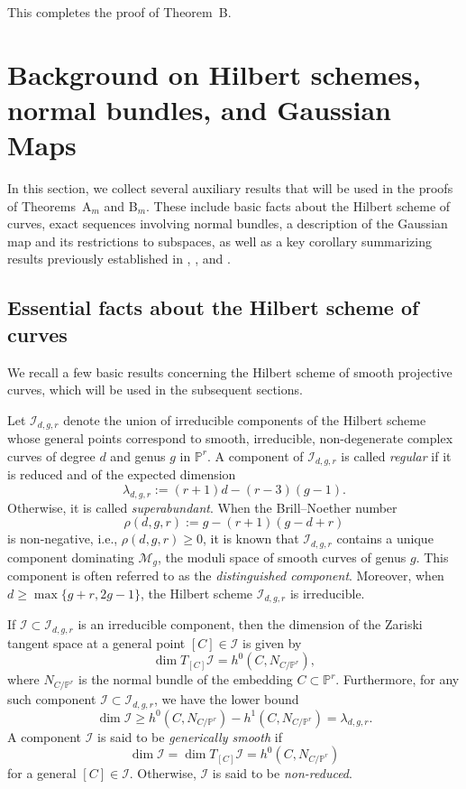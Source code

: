 \documentclass[a4paper,12pt]{amsart}
\def\dim{\operatorname{dim}}
\begin{document}
This completes the proof of \textnormal{Theorem~B}.

\medskip



\section{Background on Hilbert schemes, normal bundles, and Gaussian Maps}\label{Sec3}


In this section, we collect several auxiliary results that will be used in the proofs of \textnormal{Theorems~A$_m$} and \textnormal{B$_m$}. These include basic facts about the Hilbert scheme of curves, exact sequences involving normal bundles, a description of the Gaussian map and its restrictions to subspaces, as well as a key corollary summarizing results previously established in \cite{CilMir1990}, \cite{CLM96}, and \cite{CIK21}.

\subsection{Essential facts about the Hilbert scheme of curves}\label{Sec31}

We recall a few basic results concerning the Hilbert scheme of smooth projective curves, which will be used in the subsequent sections.

Let $\mathcal{I}_{d,g,r}$ denote the union of irreducible components of the Hilbert scheme whose general points correspond to smooth, irreducible, non-degenerate complex curves of degree $d$ and genus $g$ in $\mathbb{P}^r$. A component of $\mathcal{I}_{d,g,r}$ is called \emph{regular} if it is reduced and of the expected dimension
\[
 \lambda_{d,g,r} := (r+1)d - (r-3)(g-1).
\]
Otherwise, it is called \emph{superabundant}. When the Brill–Noether number
\[
 \rho(d,g,r) := g - (r+1)(g - d + r)
\]
is non-negative, i.e., $\rho(d,g,r) \geq 0$, it is known that $\mathcal{I}_{d,g,r}$ contains a unique component dominating $\mathcal{M}_g$, the moduli space of smooth curves of genus $g$. This component is often referred to as the \emph{distinguished component}. Moreover, when $d \geq \max \{g + r, 2g - 1\}$, the Hilbert scheme $\mathcal{I}_{d,g,r}$ is irreducible.

If $\mathcal{I} \subset \mathcal{I}_{d,g,r}$ is an irreducible component, then the dimension of the Zariski tangent space at a general point $[C] \in \mathcal{I}$ is given by
\[
 \dim T_{[C]} \mathcal{I} = h^0(C, N_{C/\mathbb{P}^r}),
\]
where $N_{C/\mathbb{P}^r}$ is the normal bundle of the embedding $C \subset \mathbb{P}^r$. Furthermore, for any such component $\mathcal{I} \subset \mathcal{I}_{d,g,r}$, we have the lower bound
\[
 \dim \mathcal{I} \geq h^0(C, N_{C/\mathbb{P}^r}) - h^1(C, N_{C/\mathbb{P}^r}) = \lambda_{d,g,r}.
\]
A component $\mathcal{I}$ is said to be \emph{generically smooth} if
\[
 \dim \mathcal{I} = \dim T_{[C]} \mathcal{I} = h^0(C, N_{C/\mathbb{P}^r})
\]
for a general $[C] \in \mathcal{I}$.
Otherwise, $\mathcal{I}$ is said to be \emph{non-reduced}.
\end{document}
